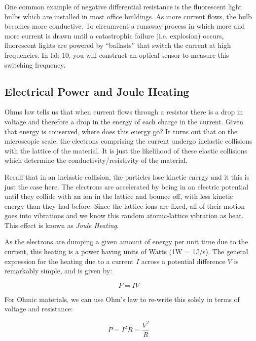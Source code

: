 \documentclass{tufte-book}
\begin{document}
One common example of negative differential resistance is the fluorescent light bulbs which are installed in most office buildings. As more current flows, the bulb becomes more conductive. To circumvent a runaway process in which more and more current is drawn until a catastrophic failure (i.e. explosion) occurs, fluorescent lights are powered by ``ballasts'' that switch the current at high frequencies. In lab 10, you will construct an optical sensor to measure this switching frequency.


\subsection{Electrical Power and Joule Heating}
Ohms law tells us that when current flows through a resistor there is a drop in voltage and therefore a drop in the energy of each charge in the current. Given that energy is conserved, where does this energy go? It turns out that on the microscopic scale, the electrons comprising the current undergo inelastic collisions with the lattice of the material. It is just the likelihood of these elastic collisions which determine the conductivity/resistivity of the material. 

Recall that in an inelastic collision, the particles lose kinetic energy and it this is just the case here. The electrons are accelerated by being in an electric potential until they collide with an ion in the lattice and bounce off, with less kinetic energy than they had before. Since the lattice ions are fixed, all of their motion goes into vibrations and we know this random atomic-lattice vibration as heat. This effect is known as \textit{Joule Heating}.

As the electrons are dumping a given amount of energy per unit time due to the current, this heating is a power having units of Watts (1W = 1J/s). The general expression for the heating due to a current $I$ across a potential difference $V$ is remarkably simple, and is given by:

\begin{equation}\label{eq:joule_gen}
\boxed{P=IV}
\end{equation}

For Ohmic materials, we can use Ohm's law to re-write this solely in terms of voltage and resistance:

\begin{equation}\label{eq:joule_ohm}
P = I^2R = \frac{V^2}{R}
\end{equation}
\end{document}
